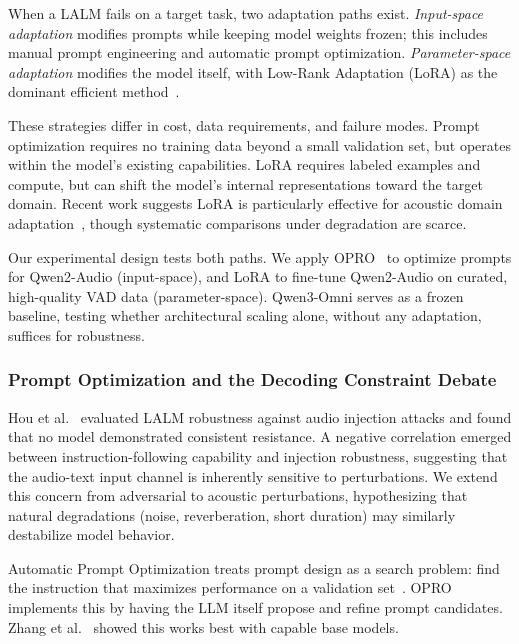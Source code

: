 \documentclass[11pt,a4paper]{article}
\begin{document}
When a LALM fails on a target task, two adaptation paths exist. \textit{Input-space adaptation} modifies prompts while keeping model weights frozen; this includes manual prompt engineering and automatic prompt optimization. \textit{Parameter-space adaptation} modifies the model itself, with Low-Rank Adaptation (LoRA) as the dominant efficient method~\cite{hu2022lora}.

These strategies differ in cost, data requirements, and failure modes. Prompt optimization requires no training data beyond a small validation set, but operates within the model's existing capabilities. LoRA requires labeled examples and compute, but can shift the model's internal representations toward the target domain. Recent work suggests LoRA is particularly effective for acoustic domain adaptation~\cite{yu2024investigating,wang2025lope,bn2025finetuning}, though systematic comparisons under degradation are scarce.

Our experimental design tests both paths. We apply OPRO~\cite{yang2023large} to optimize prompts for Qwen2-Audio (input-space), and LoRA to fine-tune Qwen2-Audio on curated, high-quality VAD data (parameter-space). Qwen3-Omni serves as a frozen baseline, testing whether architectural scaling alone, without any adaptation, suffices for robustness.

\subsubsection{Prompt Optimization and the Decoding Constraint Debate}
\label{subsubsec:apo}

Hou et al.~\cite{hou2025evaluating} evaluated LALM robustness against audio injection attacks
and found that no model demonstrated consistent resistance. A negative correlation emerged
between instruction-following capability and injection robustness, suggesting that the
audio-text input channel is inherently sensitive to perturbations. We extend this concern
from adversarial to acoustic perturbations, hypothesizing that natural degradations (noise,
reverberation, short duration) may similarly destabilize model behavior.

Automatic Prompt Optimization treats prompt design as a search problem: find the instruction that maximizes performance on a validation set~\cite{ramnath2025systematic,CHEN2025101260}. OPRO~\cite{yang2023large} implements this by having the LLM itself propose and refine prompt candidates. Zhang et al.~\cite{zhang2024revisiting} showed this works best with capable base models.
\end{document}
